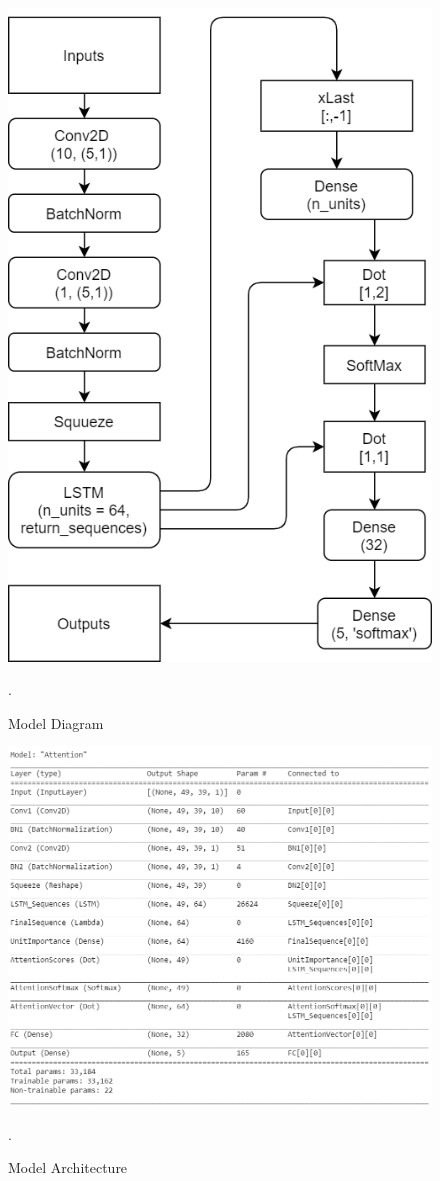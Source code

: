 \documentclass[11pt,english]{article}
\begin{document}
%
\begin{figure}[!ht]
\centering
\includegraphics[width=\columnwidth]{./Figs/Model.png}
\caption{ Model Diagram}.
\label{fig: Model}	
\end{figure}

\onecolumn

\begin{figure}[!ht]
\centering
\includegraphics[width=\columnwidth]{./Figs/Architecture.png}
\caption{ Model Architecture}.
\label{fig: Architecture}	
\end{figure}
\end{document}
